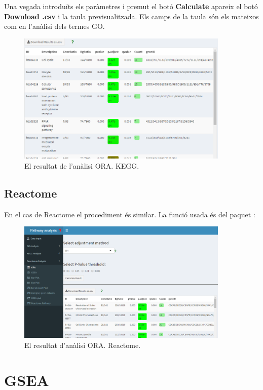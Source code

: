 Una vegada introduïts els paràmetres i premut el botó \textbf{Calculate} apareix el botó \textbf{Download .csv} i la taula previsualitzada. Els camps de la taula són els mateixos com en l'anàlisi dels termes GO.
\begin{figure}[H]
\centering
\includegraphics[width=0.9\textwidth]{figures/App_F9_Items_KEGG_ORA_Table.png} 
\caption{El resultat de l'anàlisi \gls{ORA}. \gls{KEGG}.}
\end{figure}

\subsection{Reactome}
En el cas de Reactome el procediment és similar. La funció usada és  del paquet :


\begin{figure}[H]
\centering
\includegraphics[width=0.9\textwidth]{figures/App_F10_Items_Reactome_ORA.png} 
\caption{El resultat d'anàlisi \gls{ORA}. Reactome.}
\end{figure}

\section{\gls{GSEA}}
